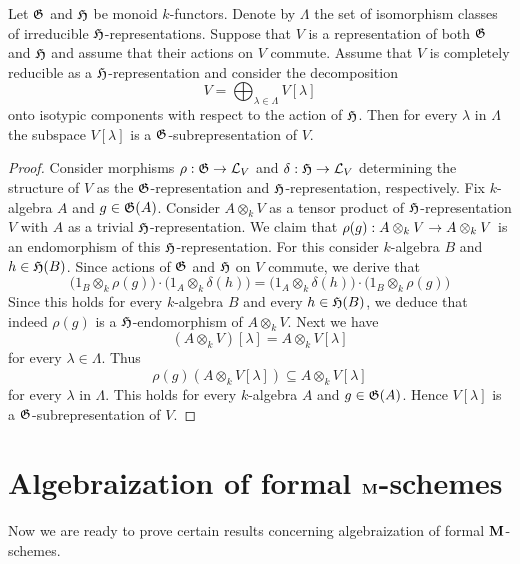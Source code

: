 \begin{proposition}\label{proposition:commuting_action_preserves_isotypic_decomposition}
Let ${\mathfrak G}$ and ${\mathfrak H}$ be monoid $k$-functors. Denote by $\Lambda$ the set of isomorphism classes of irreducible ${\mathfrak H}$-representations. Suppose that $V$ is a representation of both ${\mathfrak G}$ and ${\mathfrak H}$ and assume that their actions on $V$ commute. Assume that $V$ is completely reducible as a ${\mathfrak H}$-representation and consider the decomposition
$$V = \bigoplus_{\lambda\in \Lambda}V[\lambda]$$
onto isotypic components with respect to the action of ${\mathfrak H}$. Then for every $\lambda$ in $\Lambda$ the subspace $V[\lambda]$ is a ${\mathfrak G}$-subrepresentation of $V$.
\end{proposition}
\begin{proof}
Consider morphisms $\rho:{\mathfrak G}\rightarrow {\mathcal L}_V$ and $\delta:{\mathfrak H}\rightarrow {\mathcal L}_V$ determining the structure of $V$ as the ${\mathfrak G}$-representation and ${\mathfrak H}$-representation, respectively. Fix $k$-algebra $A$ and $g\in {\mathfrak G}(A)$. Consider $A\otimes_k V$ as a tensor product of ${\mathfrak H}$-representation $V$ with $A$ as a trivial ${\mathfrak H}$-representation. We claim that $\rho(g):A\otimes_kV \rightarrow A\otimes_kV$ is an endomorphism of this ${\mathfrak H}$-representation. For this consider $k$-algebra $B$ and $h\in {\mathfrak H}(B)$. Since actions of ${\mathfrak G}$ and ${\mathfrak H}$ on $V$ commute, we derive that
$$\big(1_B\otimes_k\rho(g)\big)\cdot \big(1_A\otimes_k\delta(h)\big) = \big(1_A\otimes_k\delta(h)\big)\cdot \big(1_B\otimes_k\rho(g)\big)$$
Since this holds for every $k$-algebra $B$ and every $h\in {\mathfrak H}(B)$, we deduce that indeed $\rho(g)$ is a ${\mathfrak H}$-endomorphism of $A\otimes_kV$. Next we have
$$\left(A\otimes_kV\right)[\lambda] = A\otimes_k V[\lambda]$$
for every $\lambda \in \Lambda$. Thus
$$\rho(g)\left(A \otimes_k V[\lambda] \right)\subseteq A \otimes_kV[\lambda]$$
for every $\lambda$ in $\Lambda$. This holds for every $k$-algebra $A$ and $g\in {\mathfrak G}(A)$. Hence $V[\lambda]$ is a ${\mathfrak G}$-subrepresentation of $V$.
\end{proof}

\section{Algebraization of formal $\mathbf{M}$-schemes}
\noindent
Now we are ready to prove certain results concerning algebraization of formal $\mathbf{M}$-schemes.

